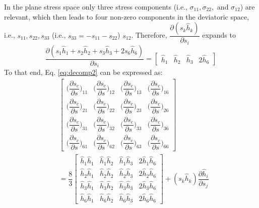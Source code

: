 \documentclass[12pt]{amsart}
\begin{document}
In the plane stress space only three stress components (i.e., $\sigma_{11}, \sigma_{22},$ and $\sigma_{12}$) are relevant, which then leads to four non-zero components in the deviatoric space, i.e., $s_{11}, s_{22}, s_{33}$ (i.e., $s_{33}=-s_{11}-s_{22}$) $s_{12}$.
Therefore, $\dfrac{\partial(s_k\hat{h}_k)}{\partial s_i}$ expands to
\begin{equation}
  \label{eq:dsh_ds}
  \dfrac{\partial(s_1\hat{h}_1+s_2\hat{h}_2+s_3\hat{h}_3+2s_6\hat{h}_6)}{\partial s_i}=
  \begin{bmatrix}
    \hat{h}_1&\hat{h}_2&\hat{h}_3&2\hat{h}_6
  \end{bmatrix}
\end{equation}
To that end, Eq. \ref{eq:decomp2} can be expressed as:
\begin{equation}
  \label{eq:dsc_ds_matrix}
  \begin{split}
    &\begin{bmatrix}
      \bigg( \dfrac{\partial s_c}{\partial s}\bigg)_{11}&\bigg( \dfrac{\partial s_c}{\partial s}\bigg)_{12} &\bigg( \dfrac{\partial s_c}{\partial s}\bigg)_{13}&\bigg( \dfrac{\partial s_c}{\partial s}\bigg)_{16}\\
      \bigg( \dfrac{\partial s_c}{\partial s}\bigg)_{21}&\bigg( \dfrac{\partial s_c}{\partial s}\bigg)_{22} &\bigg( \dfrac{\partial s_c}{\partial s}\bigg)_{23} &\bigg( \dfrac{\partial s_c}{\partial s}\bigg)_{26}\\
      \bigg( \dfrac{\partial s_c}{\partial s}\bigg)_{31}&\bigg( \dfrac{\partial s_c}{\partial s}\bigg)_{32} &\bigg( \dfrac{\partial s_c}{\partial s}\bigg)_{33}&\bigg( \dfrac{\partial s_c}{\partial s}\bigg)_{36}\\
      \bigg( \dfrac{\partial s_c}{\partial s}\bigg)_{61}&\bigg( \dfrac{\partial s_c}{\partial s}\bigg)_{62} &\bigg( \dfrac{\partial s_c}{\partial s}\bigg)_{63}&\bigg( \dfrac{\partial s_c}{\partial s}\bigg)_{66}
    \end{bmatrix}\\
    &=\dfrac{8}{3}
    \begin{bmatrix}
      \hat{h}_1\hat{h}_1&\hat{h}_1\hat{h}_2&\hat{h}_1\hat{h}_3&2\hat{h}_1\hat{h}_6\\
      \hat{h}_2\hat{h}_1&\hat{h}_2\hat{h}_2&\hat{h}_2\hat{h}_3&2\hat{h}_2\hat{h}_6\\
      \hat{h}_3\hat{h}_1&\hat{h}_3\hat{h}_2&\hat{h}_3\hat{h}_3&2\hat{h}_3\hat{h}_6\\
      \hat{h}_6\hat{h}_1&\hat{h}_6\hat{h}_2&\hat{h}_6\hat{h}_3&2\hat{h}_6\hat{h}_6
    \end{bmatrix}
    +(s_k\hat{h}_k)\dfrac{\partial\hat{h}_i}{\partial s_j}
  \end{split}
\end{equation}
\end{document}
